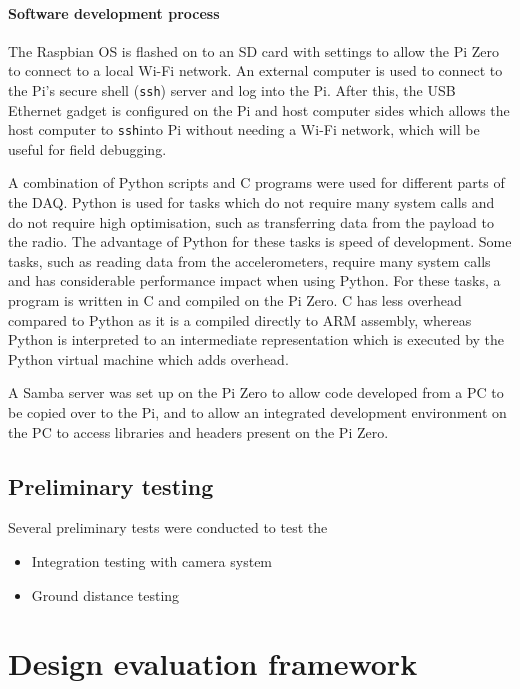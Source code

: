 \documentclass[a4paper,11pt]{article}
\newcommand{\ssh}{\texttt{ssh}}
\begin{document}
\paragraph{Software development process}

The Raspbian OS is flashed on to an SD card with settings to allow the Pi Zero to connect to a local Wi-Fi network. An external computer is used to connect to the Pi's secure shell (\ssh) server and log into the Pi. After this, the USB Ethernet gadget is configured on the Pi and host computer sides which allows the host computer to \ssh into Pi without needing a Wi-Fi network, which will be useful for field debugging.

A combination of Python scripts and C programs were used for different parts of the DAQ. Python is used for tasks which do not require many system calls and do not require high optimisation, such as transferring data from the payload to the radio. The advantage of Python for these tasks is speed of development.  Some tasks, such as reading data from the accelerometers, require many system calls and has considerable performance impact when using Python. For these tasks, a program is written in C and compiled on the Pi Zero. C has less overhead compared to Python as it is a compiled directly to ARM assembly, whereas Python is interpreted to an intermediate representation which is executed by the Python virtual machine which adds overhead.

A Samba server was set up on the Pi Zero to allow code developed from a PC to be copied over to the Pi, and to allow an integrated development environment on the PC to access libraries and headers present on the Pi Zero.

\subsection{Preliminary testing}

Several preliminary tests were conducted to test the

\begin{itemize}
  \item Integration testing with camera system %
  \item Ground distance testing %
\end{itemize}

\section{Design evaluation framework}
\end{document}
